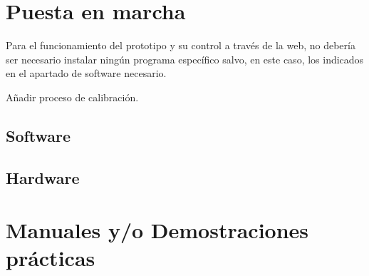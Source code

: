 \section{Puesta en marcha}
Para el funcionamiento del prototipo y su control a través de la web, no debería ser necesario instalar ningún programa específico salvo, en este caso, los indicados en el apartado de software necesario.

Añadir proceso de calibración.

\subsection{Software}
\subsection{Hardware}



\section{Manuales y/o Demostraciones prácticas}




    
     